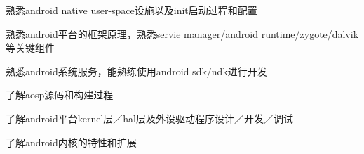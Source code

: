   \item 熟悉android native user-space设施以及init启动过程和配置
  \item 熟悉android平台的框架原理，熟悉servie manager/android runtime/zygote/dalvik等关键组件
  \item 熟悉android系统服务，能熟练使用android sdk/ndk进行开发
  \item 了解aosp源码和构建过程
  \item 了解android平台kernel层／hal层及外设驱动程序设计／开发／调试
  \item 了解android内核的特性和扩展
